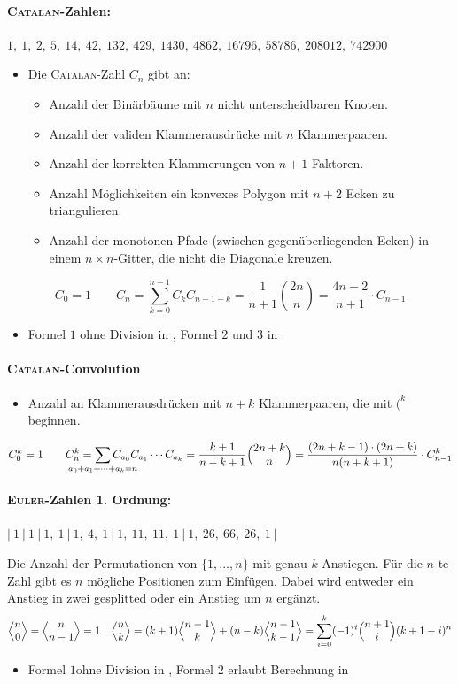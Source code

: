 \paragraph{\textsc{Catalan}-Zahlen:}
$1,~1,~2,~5,~14,~42,~132,~429,~1430,~4862,~16796,~58786,~208012,~742900$
\begin{itemize}
	\item Die \textsc{Catalan}-Zahl $C_n$ gibt an:
	\begin{itemize}
		\item Anzahl der Binärbäume mit $n$ nicht unterscheidbaren Knoten.
		\item Anzahl der validen Klammerausdrücke mit $n$ Klammerpaaren.
		\item Anzahl der korrekten Klammerungen von $n+1$ Faktoren.
		\item Anzahl Möglichkeiten ein konvexes Polygon mit $n + 2$ Ecken zu triangulieren.
		\item Anzahl der monotonen Pfade (zwischen gegenüberliegenden Ecken) in
		einem $n \times n$-Gitter, die nicht die Diagonale kreuzen.
	\end{itemize}
\end{itemize}
\[C_0 = 1\qquad C_n = \sum\limits_{k = 0}^{n - 1} C_kC_{n - 1 - k} =
\frac{1}{n + 1}\binom{2n}{n} = \frac{4n - 2}{n+1} \cdot C_{n-1}\]
\begin{itemize}
	\item Formel $1$ ohne Division in , Formel $2$ und $3$ in 
\end{itemize}

\paragraph{\textsc{Catalan}-Convolution}
\begin{itemize}
	\item Anzahl an Klammerausdrücken mit $n+k$ Klammerpaaren, die mit $\texttt{(}^k$ beginnen.
\end{itemize}
\[C^k_0 = 1\qquad C^k_n = \sum\limits_{\mathclap{a_0+a_1+\dots+a_k=n}} C_{a_0}C_{a_1}\cdots C_{a_k} =
\frac{k+1}{n+k+1}\binom{2n+k}{n} = \frac{(2n+k-1)\cdot(2n+k)}{n(n+k+1)} \cdot C^k_{n-1}\]

\paragraph{\textsc{Euler}-Zahlen 1. Ordnung:}
$|~1~|~1~|~1,~1~|~1,~4,~1~|~1,~11,~11,~1~|~1,~26,~66,~26,~1~|$

Die Anzahl der Permutationen von $\{1, \ldots, n\}$ mit genau $k$ Anstiegen.
Für die $n$-te Zahl gibt es $n$ mögliche Positionen zum Einfügen.
Dabei wird entweder ein Anstieg in zwei gesplitted oder ein Anstieg um $n$ ergänzt.
\[\Bigl\langle \begin{matrix} n \\ 0 \end{matrix} \Bigr\rangle = \Bigl\langle \begin{matrix} n \\ n-1 \end{matrix} \Bigr\rangle = 1 \quad
\Bigl\langle \begin{matrix} n \\ k \end{matrix} \Bigr\rangle = (k+1) \Bigl\langle \begin{matrix} n-1 \\ k \end{matrix} \Bigr\rangle + (n-k) \Bigl\langle \begin{matrix} n-1 \\ k-1 \end{matrix} \Bigr\rangle=
\sum_{i=0}^{k} (-1)^i\Bigl( \begin{matrix} n+1 \\ i \end{matrix} \Bigr)(k+1-i)^n\]
\begin{itemize}
	\item Formel $1$ohne Division in , Formel $2$ erlaubt Berechnung in 
\end{itemize}

